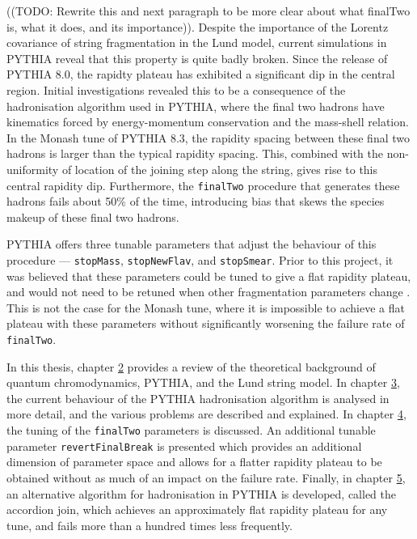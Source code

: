 \documentclass[12pt,a4paper]{report}
\begin{document}
((TODO: Rewrite this and next paragraph to be more clear about what finalTwo is, what it does, and its importance)). Despite the importance of the Lorentz covariance of string fragmentation in the Lund model, current simulations in PYTHIA reveal that this property is quite badly broken. Since the release of PYTHIA 8.0, the rapidty plateau has exhibited a significant dip in the central region. Initial investigations revealed this to be a consequence of the hadronisation algorithm used in PYTHIA, where the final two hadrons have kinematics forced by energy-momentum conservation and the mass-shell relation. In the Monash tune of PYTHIA 8.3, the rapidity spacing between these final two hadrons is larger than the typical rapidity spacing. This, combined with the non-uniformity of location of the joining step along the string, gives rise to this central rapidity dip. Furthermore, the \texttt{finalTwo} procedure that generates these hadrons fails about 50\% of the time, introducing bias that skews the species makeup of these final two hadrons.

PYTHIA offers three tunable parameters that adjust the behaviour of this procedure --- \texttt{stopMass}, \texttt{stopNewFlav}, and \texttt{stopSmear}. Prior to this project, it was believed that these parameters could be tuned to give a flat rapidity plateau, and would not need to be retuned when other fragmentation parameters change \cite{Bierlich:2022pfr,Sjostrand:2006za}. This is not the case for the Monash tune, where it is impossible to achieve a flat plateau with these parameters without significantly worsening the failure rate of \texttt{finalTwo}.

In this thesis, chapter \hyperref[chap:background]{2} provides a review of the theoretical background of quantum chromodynamics, PYTHIA, and the Lund string model. In chapter \hyperref[chap:fragmentation]{3}, the current behaviour of the PYTHIA hadronisation algorithm is analysed in more detail, and the various problems are described and explained. In chapter \hyperref[chap:tuning]{4}, the tuning of the \texttt{finalTwo} parameters is discussed. An additional tunable parameter \texttt{revertFinalBreak} is presented which provides an additional dimension of parameter space and allows for a flatter rapidity plateau to be obtained without as much of an impact on the failure rate. Finally, in chapter \hyperref[chap:accordion]{5}, an alternative algorithm for hadronisation in PYTHIA is developed, called the accordion join, which achieves an approximately flat rapidity plateau for any tune, and fails more than a hundred times less frequently.
\end{document}
